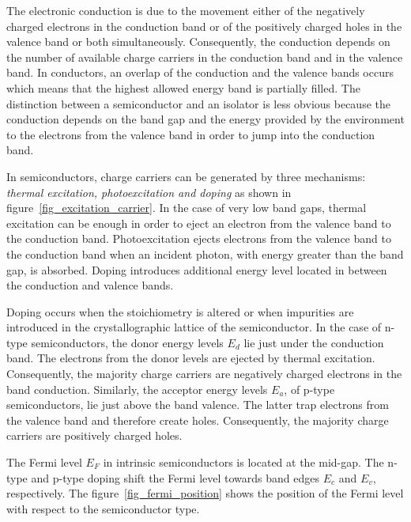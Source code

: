 

The electronic conduction is due to the movement either of the negatively 
charged electrons in the conduction band or of the positively charged holes 
in the valence band or both simultaneously. 
Consequently, the conduction depends on the number of available charge carriers
in the conduction band and in the valence band. 
In conductors, an overlap of the conduction and the valence bands occurs 
which means that the highest allowed energy band is partially filled. 
The distinction between a semiconductor and an isolator is less obvious 
because the conduction depends on the band gap and the energy provided by 
the environment to the electrons from the valence band in order to jump 
into the conduction band.

In semiconductors, charge carriers can be generated by three mechanisms: 
\emph{thermal excitation, photoexcitation and doping} as shown in 
figure~\ref{fig_excitation_carrier}. 
In the case of very low band gaps, thermal excitation can be enough in order 
to eject an electron from the valence band to the conduction band. 
Photoexcitation ejects electrons from the valence band to the conduction 
band when an incident photon, with energy greater than the band gap, is absorbed. 
Doping introduces additional energy level located in between the conduction and 
valence bands.

Doping occurs when the stoichiometry is altered or when impurities are 
introduced in the crystallographic lattice of the semiconductor. 
In the case of n-type semiconductors, the donor energy levels $E_d$ lie just 
under the conduction band. The electrons from the donor levels are ejected by 
thermal excitation. 
Consequently, the majority charge carriers are negatively charged electrons 
in the band conduction. 
Similarly, the acceptor energy levels $E_a$, of p-type semiconductors, 
lie just above the band valence. 
The latter trap electrons from the valence band and therefore create holes. 
Consequently, the majority charge carriers are positively charged holes.



The Fermi level $E_F$ in intrinsic semiconductors is located at the mid-gap. 
The n-type and p-type doping shift the Fermi level towards band edges 
$E_c$ and $E_v$, respectively. 
The figure~\ref{fig_fermi_position} shows the position of the Fermi level 
with respect to the semiconductor type.





